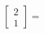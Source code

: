 \documentclass[preview]{standalone}
\begin{document}
\begin{align*}
\begin{bmatrix} 2 \\ 1 \end{bmatrix} =
\end{align*}
\end{document}
